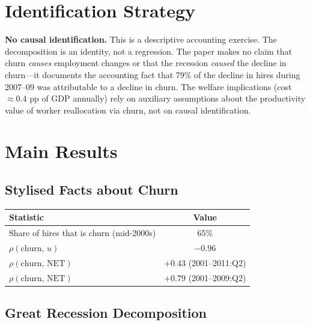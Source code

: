 \section{Identification Strategy}

\textbf{No causal identification.} This is a descriptive accounting exercise.
The decomposition is an identity, not a regression. The paper makes no claim
that churn \emph{causes} employment changes or that the recession \emph{caused}
the decline in churn---it documents the accounting fact that 79\% of the
decline in hires during 2007--09 was attributable to a decline in churn. The
welfare implications (cost $\approx0.4$ pp of GDP annually) rely on auxiliary
assumptions about the productivity value of worker reallocation via churn, not
on causal identification.

\section{Main Results}

\subsection*{Stylised Facts about Churn}

\begin{center}
\begin{tabular}{lc}
\toprule
\textbf{Statistic} & \textbf{Value} \\
\midrule
Share of hires that is churn (mid-2000s) & 65\% \\
$\rho(\text{churn},\,u)$ & $-0.96$ \\
$\rho(\text{churn},\,\text{NET})$ & $+0.43$ (2001--2011:Q2) \\
$\rho(\text{churn},\,\text{NET})$ & $+0.79$ (2001--2009:Q2) \\
\bottomrule
\end{tabular}
\end{center}

\subsection*{Great Recession Decomposition}

